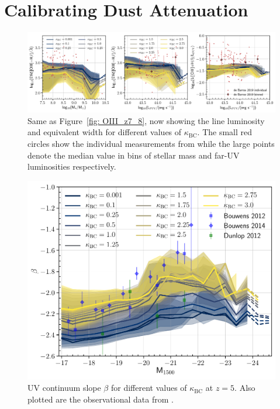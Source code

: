 \section{Calibrating Dust Attenuation}\label{app:calibration}
\begin{figure}
	\centering
	\includegraphics[width=\textwidth]{./figures/App_BC_plot_EW}
	\caption{Same as Figure~\ref{fig: OIII_z7_8}, now showing the line luminosity and equivalent width for different values of $\kappa_{\textrm{BC}}$. The small red circles show the individual measurements from \protect\cite{deBarros19_OIIIHbeta} while the large points denote the median value in bins of stellar mass and far-UV luminosities respectively.\label{fig: line lum diff kappa}}
\end{figure}
\begin{figure}
	\centering
	\includegraphics[width=\columnwidth]{./figures/App_BC_plot_beta}
	\caption{UV continuum slope $\beta$ for different values of $\kappa_{\textrm{BC}}$ at $z=5$. Also plotted are the observational data from \protect\cite{Dunlop2012,Bouwens2012b,Bouwens2014a}. \label{fig: beta diff kappa}}
\end{figure}
